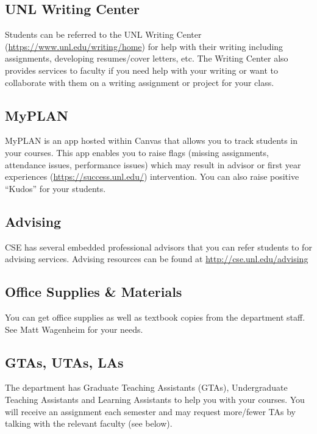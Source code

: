 \documentclass[12pt]{scrartcl}
\begin{document}
\subsection{UNL Writing Center}

Students can be referred to the UNL Writing Center (\url{https://www.unl.edu/writing/home}) for help with their writing including
assignments, developing resumes/cover letters, etc.  The Writing
Center also provides services to faculty if you need help with
your writing or want to collaborate with them on a writing assignment
or project for your class.

\subsection{MyPLAN}

MyPLAN is an app hosted within Canvas that allows you to
track students in your courses.  This app enables you to
raise flags (missing assignments, attendance issues, performance
issues) which may result in advisor or first year experiences
(\url{https://success.unl.edu/}) intervention.  You can also
raise positive ``Kudos'' for your students.

\subsection{Advising}

CSE has several embedded professional advisors that you can
refer students to for advising services.  Advising resources
can be found at \url{http://cse.unl.edu/advising} 

\subsection{Office Supplies \& Materials}

You can get office supplies as well as textbook copies from the
department staff.  See Matt Wagenheim for your needs.

\subsection{GTAs, UTAs, LAs}

The department has Graduate Teaching Assistants (GTAs), 
Undergraduate Teaching Assistants and Learning Assistants
to help you with your courses.  You will receive an assignment
each semester and may request more/fewer TAs by talking
with the relevant faculty (see below).
\end{document}
